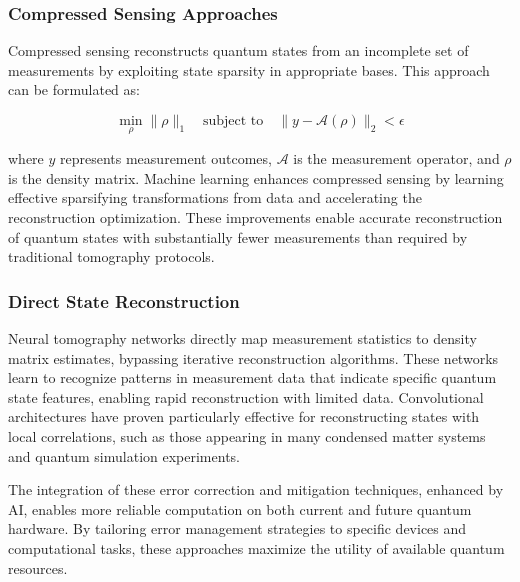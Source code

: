 \subsubsection{Compressed Sensing Approaches}

Compressed sensing reconstructs quantum states from an incomplete set of measurements by exploiting state sparsity in appropriate bases. This approach can be formulated as:

\begin{equation}
\min_\rho \|\rho\|_1 \quad \text{subject to} \quad \|y - \mathcal{A}(\rho)\|_2 < \epsilon
\end{equation}

where $y$ represents measurement outcomes, $\mathcal{A}$ is the measurement operator, and $\rho$ is the density matrix. Machine learning enhances compressed sensing by learning effective sparsifying transformations from data and accelerating the reconstruction optimization. These improvements enable accurate reconstruction of quantum states with substantially fewer measurements than required by traditional tomography protocols.

\subsubsection{Direct State Reconstruction}

Neural tomography networks directly map measurement statistics to density matrix estimates, bypassing iterative reconstruction algorithms. These networks learn to recognize patterns in measurement data that indicate specific quantum state features, enabling rapid reconstruction with limited data. Convolutional architectures have proven particularly effective for reconstructing states with local correlations, such as those appearing in many condensed matter systems and quantum simulation experiments.

The integration of these error correction and mitigation techniques, enhanced by AI, enables more reliable computation on both current and future quantum hardware. By tailoring error management strategies to specific devices and computational tasks, these approaches maximize the utility of available quantum resources.

